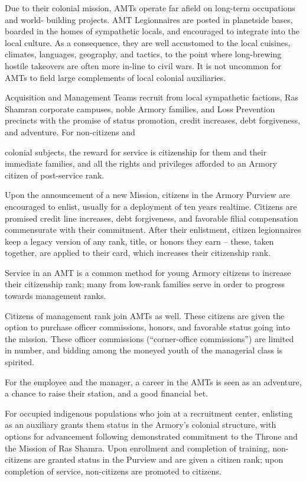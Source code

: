 Due to their colonial mission, AMTs operate far afield on long-term occupations and world-
building projects. AMT Legionnaires are posted in planetside bases, boarded in the homes of
sympathetic locals, and encouraged to integrate into the local culture. As a consequence, they
are well accustomed to the local cuisines, climates, languages, geography, and tactics, to the
point where long-brewing hostile takeovers are often more in-line to civil wars. It is not
uncommon for AMTs to field large complements of local colonial auxiliaries.


Acquisition and Management Teams recruit from local sympathetic factions, Ras Shamran
corporate campuses, noble Armory families, and Loss Prevention precincts with the promise of
status promotion, credit increases, debt forgiveness, and adventure. For non-citizens and




colonial subjects, the reward for service is citizenship for them and their immediate families, and
all the rights and privileges afforded to an Armory citizen of post-service rank.


Upon the announcement of a new Mission, citizens in the Armory Purview are encouraged to
enlist, usually for a deployment of ten years realtime. Citizens are promised credit line increases,
debt forgiveness, and favorable filial compensation commensurate with their commitment. After
their enlistment, citizen legionnaires keep a legacy version of any rank, title, or honors they earn
-- these, taken together, are applied to their card, which increases their citizenship rank.


Service in an AMT is a common method for young Armory citizens to increase their citizenship
rank; many from low-rank families serve in order to progress towards management ranks.


Citizens of management rank join AMTs as well. These citizens are given the option to purchase
officer commissions, honors, and favorable status going into the mission. These officer
commissions (“corner-office commissions”) are limited in number, and bidding among the
moneyed youth of the managerial class is spirited.


For the employee and the manager, a career in the AMTs is seen as an adventure, a chance to
raise their station, and a good financial bet.


For occupied indigenous populations who join at a recruitment center, enlisting as an auxiliary
grants them status in the Armory’s colonial structure, with options for advancement following
demonstrated commitment to the Throne and the Mission of Ras Shamra. Upon enrollment and
completion of training, non-citizens are granted status in the Purview and are given a citizen
rank; upon completion of service, non-citizens are promoted to citizens.


